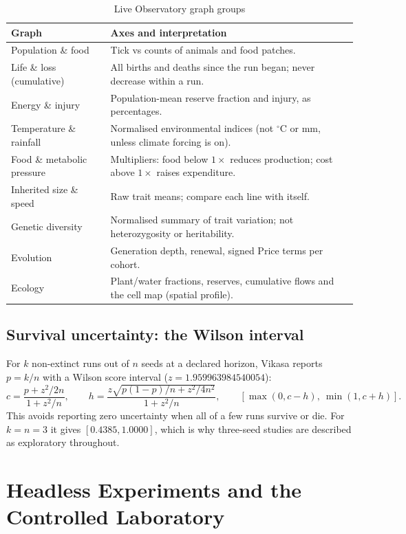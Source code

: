\begin{table}[htbp]
\centering
\caption{Live Observatory graph groups}
\begin{tabularx}{\textwidth}{lL}
\toprule
Graph & Axes and interpretation \\
\midrule
Population \& food & Tick vs counts of animals and food patches. \\
Life \& loss (cumulative) & All births and deaths since the run began; never decrease within a run. \\
Energy \& injury & Population-mean reserve fraction and injury, as percentages. \\
Temperature \& rainfall & Normalised environmental indices (not $^{\circ}$C or mm, unless climate forcing is on). \\
Food \& metabolic pressure & Multipliers: food below $1\times$ reduces production; cost above $1\times$ raises expenditure. \\
Inherited size \& speed & Raw trait means; compare each line with itself. \\
Genetic diversity & Normalised summary of trait variation; not heterozygosity or heritability. \\
Evolution & Generation depth, renewal, signed Price terms per cohort. \\
Ecology & Plant/water fractions, reserves, cumulative flows and the cell map (spatial profile). \\
\bottomrule
\end{tabularx}
\end{table}

\section{Survival uncertainty: the Wilson interval}
For $k$ non-extinct runs out of $n$ seeds at a declared horizon, Vikasa reports
$p=k/n$ with a Wilson score interval ($z=1.959963984540054$):
\[
c=\frac{p+z^2/2n}{1+z^2/n},\qquad
h=\frac{z\sqrt{p(1-p)/n+z^2/4n^2}}{1+z^2/n},\qquad
[\max(0,c-h),\ \min(1,c+h)].
\]
This avoids reporting zero uncertainty when all of a few runs survive or die. For
$k=n=3$ it gives $[0.4385,1.0000]$, which is why three-seed studies are described
as exploratory throughout.

\chapter{Headless Experiments and the Controlled Laboratory}
\label{ch:experiments}

